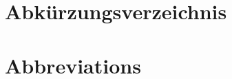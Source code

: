 %
%
\appendix
\pagestyle{appendixstyle}

%

\listoffigures

%
%

\listoftables

%
%

\listofalgorithms

%
%

{
\chapter{Abkürzungsverzeichnis}
}{
\chapter{Abbreviations}
}

